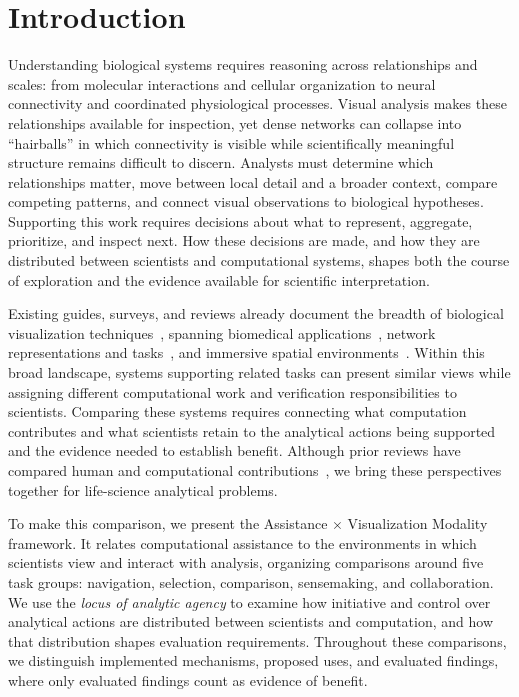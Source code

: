\section{Introduction}
\label{sec:introduction}
Understanding biological systems requires reasoning across relationships and scales: from molecular interactions and cellular organization to neural connectivity and coordinated physiological processes. Visual analysis makes these relationships available for inspection, yet dense networks can collapse into ``hairballs'' in which connectivity is visible while scientifically meaningful structure remains difficult to discern. Analysts must determine which relationships matter, move between local detail and a broader context, compare competing patterns, and connect visual observations to biological hypotheses. Supporting this work requires decisions about what to represent, aggregate, prioritize, and inspect next. How these decisions are made, and how they are distributed between scientists and computational systems, shapes both the course of exploration and the evidence available for scientific interpretation.

Existing guides, surveys, and reviews already document the breadth of biological visualization techniques~\cite{Kerren2017BioVisExplorer,ODonoghue2018BiomedicalData}, spanning biomedical applications~\cite{Furmanova2024BiomedicalVisualization}, network representations and tasks~\cite{Ehlers2025,Filipov2023Roadmap}, and immersive spatial environments~\cite{Fonnet2019ImmersiveAnalytics,Joos2025VisNetIA}. Within this broad landscape, systems supporting related tasks can present similar views while assigning different computational work and verification responsibilities to scientists. Comparing these systems requires connecting what computation contributes and what scientists retain to the analytical actions being supported and the evidence needed to establish benefit. Although prior reviews have compared human and computational contributions~\cite{Monadjemi2026MixedInitiative,DomovaVrotsou2023Automation}, we bring these perspectives together for life-science analytical problems.

To make this comparison, we present the Assistance $\times$ Visualization Modality framework. It relates computational assistance to the environments in which scientists view and interact with analysis, organizing comparisons around five task groups: navigation, selection, comparison, sensemaking, and collaboration. We use the \emph{locus of analytic agency} to examine how initiative and control over analytical actions are distributed between scientists and computation, and how that distribution shapes evaluation requirements. Throughout these comparisons, we distinguish implemented mechanisms, proposed uses, and evaluated findings, where only evaluated findings count as evidence of benefit.

